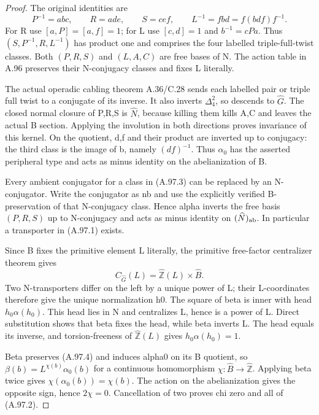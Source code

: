 \begin{proof}
The original identities are
\[
 P^{-1}=abc,\qquad R=ade,\qquad S=cef,
 \qquad L^{-1}=fbd=f(bdf)f^{-1}.
 \tag{A.97.3}
\]
For R use \([a,P]=[a,f]=1\); for L use \([c,d]=1\) and
\(b^{-1}=cPa\). Thus \((S,P^{-1},R,L^{-1})\) has product one
and comprises the four labelled triple-full-twist classes. Both
\((P,R,S)\) and \((L,A,C)\) are free bases of N. The action table
in A.96 preserves their N-conjugacy classes and fixes L literally.

The actual operadic cabling theorem A.36/C.28 sends each labelled
pair or triple full twist to a conjugate of its inverse. It also
inverts \(\Delta_4^2\), so descends to \(\widehat G\).
The closed normal closure of P,R,S is \(\widehat N\), because
killing them kills A,C and leaves the actual B section. Applying
the involution in both directions proves invariance of this kernel.
On the quotient, d,f and their product are inverted up to conjugacy:
the third class is the image of b, namely \((df)^{-1}\). Thus
\(\alpha_0\) has the asserted peripheral type and acts as minus
identity on the abelianization of B.

Every ambient conjugator for a class in (A.97.3) can be replaced by
an N-conjugator. Write the conjugator as nb and use the explicitly
verified B-preservation of that N-conjugacy class. Hence alpha
inverts the free basis \((P,R,S)\) up to N-conjugacy and acts as
minus identity on \((\widehat N)_{\rm ab}\). In particular a
transporter in (A.97.1) exists.

Since B fixes the primitive element L literally, the primitive
free-factor centralizer theorem gives
\[
 C_{\widehat G}(L)=\widehat{\mathbb Z}(L)\times\widehat B.
 \tag{A.97.4}
\]
Two N-transporters differ on the left by a unique power of L;
their L-coordinates therefore give the unique normalization h0.
The square of beta is inner with head \(h_0\alpha(h_0)\).
This head lies in N and centralizes L, hence is a power of L.
Direct substitution shows that beta fixes the head, while beta
inverts L. The head equals its inverse, and torsion-freeness of
\(\widehat{\mathbb Z}(L)\) gives \(h_0\alpha(h_0)=1\).

Beta preserves (A.97.4) and induces alpha0 on its B quotient, so
\(\beta(b)=L^{\chi(b)}\alpha_0(b)\) for a continuous homomorphism
\(\chi:\widehat B\to\widehat{\mathbb Z}\). Applying beta twice
gives \(\chi(\alpha_0(b))=\chi(b)\). The action on the
abelianization gives the opposite sign, hence \(2\chi=0\).
Cancellation of two proves chi zero and all of (A.97.2).


\end{proof}
